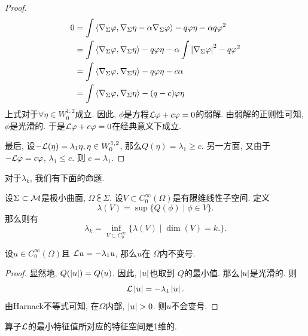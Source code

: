 \begin{proof}
    \begin{equation}
        \begin{split}
            0&=\int{\left < \nabla_{\Sigma}\varphi, \nabla_{\Sigma}\eta-\alpha\nabla_{\Sigma}\varphi\right >}-q\varphi\eta-\alpha q\varphi^2 \\
            &=\int{\left < \nabla_{\Sigma}\varphi, \nabla_{\Sigma}\eta \right >}-q\varphi\eta-\alpha\int\left | \nabla_{\Sigma}\varphi \right |^2-q\varphi^2\\
            &=\int{\left < \nabla_{\Sigma}\varphi, \nabla_{\Sigma}\eta \right >}-q\varphi\eta-c\alpha \\
            &=\int{\left < \nabla_{\Sigma}\varphi, \nabla_{\Sigma}\eta \right >}-(q-c)\varphi\eta
        \end{split}
    \end{equation}
    上式对于$\forall \eta \in W^{1,2}_0$成立. 因此, $\phi$是方程$\mathcal{L}\varphi+c\varphi=0$的弱解. 由弱解的正则性可知, $\phi$是光滑的. 于是$\mathcal{L} \varphi + c\varphi=0$在经典意义下成立.
    \par 最后, 设$-\mathcal{L}(\eta)=\lambda_1\eta, \eta \in W^{1,2}_0$, 那么$Q(\eta)=\lambda_1 \ge c$. 另一方面, 又由于$-\mathcal{L}\varphi=c\varphi$, $\lambda_1 \le c$. 则 $c=\lambda_1$.
\end{proof}
对于$\lambda_k$, 我们有下面的命题.
\begin{proposition}
    设$\Sigma \subset {\mathcal{M}}$是极小曲面, $\Omega \subsub \Sigma$. 设$V \subset C_0^\infty(\Omega)$是有限维线性子空间. 定义
    \begin{equation}
        \lambda(V)=\sup \{ Q(\phi)\mid \phi \in V\}.
    \end{equation}
    那么则有
    \begin{equation}
        \lambda_k = \inf_{V\subset C^\infty_0} \{\lambda(V)\mid \dim(V)=k.\}.
    \end{equation}
\end{proposition}

\begin{proposition}
    设$u \in C^\infty_0(\Omega)$且 $\mathcal{L} u= -\lambda_1 u$, 那么$u$在 $\Omega$内不变号.
\end{proposition}
\begin{proof}
    显然地, $Q(\left | u \right |)=Q(u)$. 因此, $\left | u \right |$也取到 $Q$的最小值. 那么$\left | u \right |$是光滑的. 则
    \begin{equation}
        \mathcal{L}\left | u \right | =-\lambda_1 \left | u \right |.
    \end{equation}
    由Harnack不等式可知, 在$\Omega$内部,  $\left | u \right | >0$. 则$u$不会变号.
\end{proof}
\begin{corollary}
    算子$\mathcal{L}$的最小特征值所对应的特征空间是1维的.
\end{corollary}

